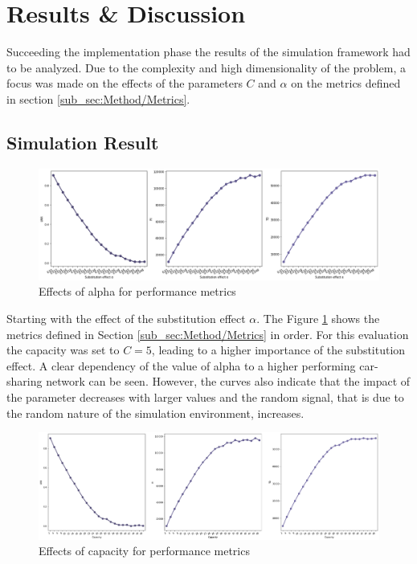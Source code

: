 \clearpage
\section{Results \& Discussion}
\label{sec:Results}


Succeeding the implementation phase the results of the simulation framework had to be analyzed. Due
to the complexity and high dimensionality of the problem, a focus was made on the effects of the parameters
$C$ and $\alpha$ on the metrics defined in section \ref{sub_sec:Method/Metrics}.

\subsection{Simulation Result}
\label{sub_sec:Results/Results}

\begin{figure}[htbp]
  \centering
  \includegraphics[width=\linewidth]{./Figures/alpha.png}
  \caption{Effects of alpha for performance metrics}
  \label{fig:Alpha}
\end{figure}

Starting with the effect of the substitution effect $\alpha$. The Figure \ref{fig:Alpha} shows the
metrics defined in Section \ref{sub_sec:Method/Metrics} in order. For this evaluation the capacity
was set to $C = 5$, leading to a higher importance of the substitution effect. A clear dependency
of the value of alpha to a higher performing car-sharing network can be seen. However, the curves
also indicate that the impact of the parameter decreases with larger values and the random
signal, that is due to the random nature of the simulation environment, increases.

\begin{figure}[htbp]
  \centering
  \includegraphics[width=\linewidth]{./Figures/capacity.png}
  \caption{Effects of capacity for performance metrics}
  \label{fig:Capacity}
\end{figure}

